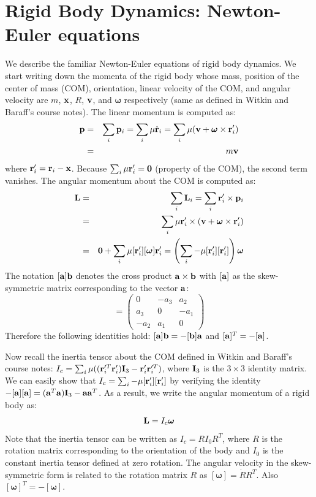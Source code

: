 \section{Rigid Body Dynamics: Newton-Euler equations}
We describe the familiar Newton-Euler equations of rigid body dynamics. We start writing down the
momenta of the rigid body whose mass, position of the center
of mass (COM), orientation,
linear velocity of the COM, and angular velocity are $m$, $\mathbf{x}$, $R$,
$\mathbf{v}$, and $\bm{\omega}$ respectively (same as defined in Witkin and
Baraff's course notes). The linear momentum  is computed as:
\begin{eqnarray}
\mathbf{p} &=& \sum_i \mathbf{p}_i = \sum_i \mathbf{\mu} \dot{\mathbf{r}}_i = \sum_i  \mathbf{\mu} (\mathbf{v} + \bm{\omega}
    \times \mathbf{r}_i') \nonumber \\
 &=& m \mathbf{v}
\end{eqnarray}
where $\mathbf{r}_i' = \mathbf{r}_i - \mathbf{x}$. Because $\sum_i \mathbf{\mu}
\mathbf{r}_i' = \mathbf{0}$ (property of the COM), the second term vanishes. The angular momentum  about the COM is computed as:
\begin{eqnarray}
\nonumber
\mathbf{L} & = & \sum_i \mathbf{L}_i  = \sum_i \mathbf{r}_i' \times \mathbf{p}_i\\
\nonumber
& = & \sum_i \mathbf{\mu} \mathbf{r}_i' \times (\mathbf{v} + \bm{\omega} \times \mathbf{r}_i')\\
&= & \mathbf{0} + \sum_i \mathbf{\mu} [\mathbf{r}_i'][\bm{\omega}]\mathbf{r}_i' = \left ( \sum_i -\mathbf{\mu} [\mathbf{r}_i'][\mathbf{r}_i'] \right )\bm{\omega}
\end{eqnarray}
The notation $[\mathbf{a}] \mathbf{b}$ denotes the cross product $\mathbf{a}\times \mathbf{b}$ with $[\mathbf{a}]$ as the skew-symmetric matrix corresponding to the vector $\mathbf{a}$:
\begin{equation}
[\vc{a}] = 
\begin{pmatrix}
0 & -a_3 & a_2\\
a_3&  0 & -a_1\\
-a_2 & a_1 & 0
\end{pmatrix}
\end{equation}
Therefore the following identities hold: $[\mathbf{a}]\mathbf{b} = -[\mathbf{b}]\mathbf{a}$ and $[\mathbf{a}]^T = -[\mathbf{a}]$.

Now recall the inertia tensor about the COM defined in Witkin and
Baraff's course notes: $I_c = \sum_i \mathbf{\mu} ((\mathbf{r}_i'^T
\mathbf{r}_i')\mathbf{I}_3 - \mathbf{r}_i' \mathbf{r}_i'^T)$, where $\mathbf{I}_3$ is the $3\times 3$
identity matrix. We can easily show that
$I_c = \sum_i -\mathbf{\mu} [\mathbf{r}_i'][\mathbf{r}_i']$ by verifying the
identity $-[\mathbf{a}][\mathbf{a}] = (\mathbf{a}^T\mathbf{a}) \mathbf{I}_3  -
\mathbf{a}\mathbf{a}^T$. As a result, we write the angular momentum of a rigid body as:
\begin{equation}
\mathbf{L} = I_c \bm{\omega}
\end{equation}
Note that the inertia tensor can be written as $I_c = RI_0R^T$, where $R$ is the rotation matrix corresponding to the orientation of the body and $I_0$ is the constant inertia tensor defined at zero rotation. The angular velocity in the skew-symmetric form is related to the rotation matrix $R$ as $[\bm{\omega}] = \dot{R}R^T$. Also $[\bm{\omega}]^T = -[\bm{\omega}]$.

